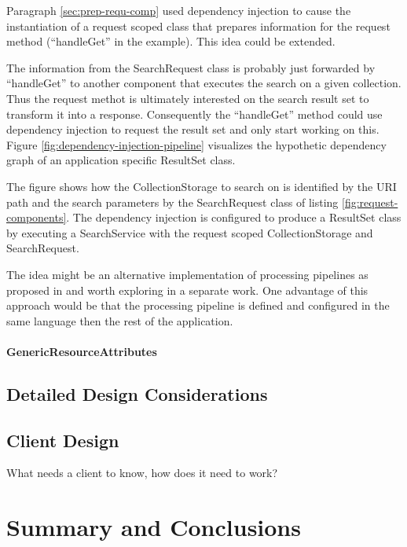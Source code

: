 \documentclass[12pt,a4paper]{scrartcl}		%
\begin{document}
Paragraph \ref{sec:prep-requ-comp} used dependency injection to cause the
instantiation of a request scoped class that prepares information for the
request method (``handleGet'' in the example). This idea could be extended.

The information from the SearchRequest class is probably just forwarded by
``handleGet'' to another component that executes the search on a given
collection. Thus the request methot is ultimately interested on the search
result set to transform it into a response. Consequently the ``handleGet''
method could use dependency injection to request the result set and only start
working on this. Figure \ref{fig:dependency-injection-pipeline} visualizes the
hypothetic dependency graph of an application specific ResultSet class.

The figure shows how the CollectionStorage to search on is identified by the URI
path and the search parameters by the SearchRequest class of listing
\ref{fig:request-components}. The dependency injection is configured to produce
a ResultSet class by executing a SearchService with the request scoped
CollectionStorage and SearchRequest.

The idea might be an alternative implementation of processing pipelines as
proposed in \cite{Davis:2011:XTR:1967428.1967437} and worth exploring in a
separate work. One advantage of this approach would be that the processing
pipeline is defined and configured in the same language then the rest of the
application.

\paragraph{GenericResourceAttributes}
\label{sec:component-genericresourceattrib}




\subsection{Detailed Design Considerations}

\subsection{Client Design}

What needs a client to know, how does it need to work?



\section{Summary and Conclusions}

\newpage
{}

\end{document}
